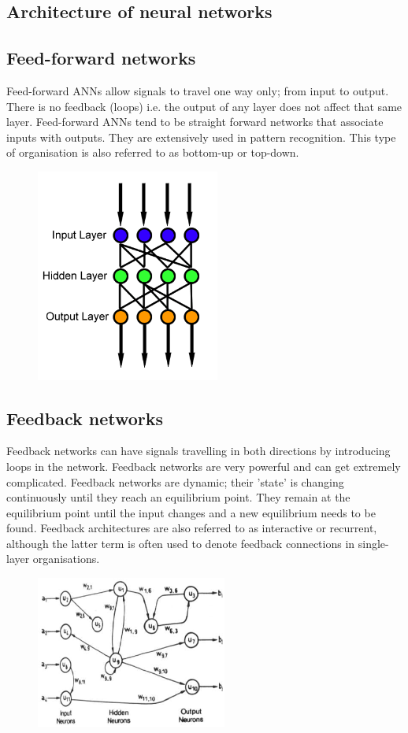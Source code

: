 \documentclass[12pt,times,a4paper]{report}
\begin{document}
{{\begin{normalsize}
\section{Architecture of neural networks}
\subsection{Feed-forward networks}
Feed-forward ANNs allow signals to travel one way only; from input to output. There
is no feedback (loops) i.e. the output of any layer does not affect that same layer. Feed-forward
ANNs tend to be straight forward networks that associate inputs with outputs. They are
extensively used in pattern recognition. This type of organisation is also referred to as bottom-up
or top-down. 
\begin{figure}[H]
\includegraphics[height=7cm,center]{ffnn.png}
\caption{}
\end{figure}
\subsection{Feedback networks}
Feedback networks can have signals travelling in both directions by introducing loops
in the network. Feedback networks are very powerful and can get extremely complicated.
Feedback networks are dynamic; their 'state' is changing continuously until they reach an
equilibrium point. They remain at the equilibrium point until the input changes and a new
equilibrium needs to be found. Feedback architectures are also referred to as interactive or
recurrent, although the latter term is often used to denote feedback connections in single-layer
organisations.

\begin{figure}[H]
\includegraphics[height=5cm,center]{fbnn.png}
\caption{}
\end{figure}
\newpage

\end{normalsize}}}
\end{document}

